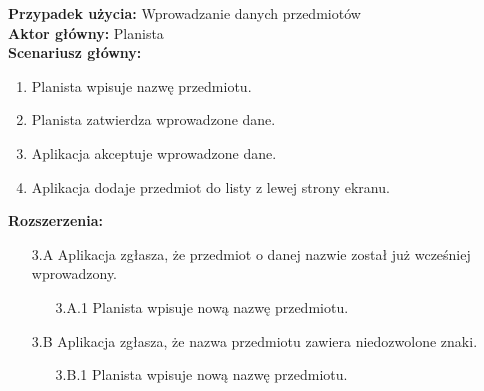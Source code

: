 \noindent
\textbf{Przypadek użycia:} Wprowadzanie danych przedmiotów\\
\textbf{Aktor główny:} Planista\\
\textbf{Scenariusz główny:}
\begin{enumerate}
	\item Planista wpisuje nazwę przedmiotu.
	\item Planista zatwierdza wprowadzone dane.
	\item Aplikacja akceptuje wprowadzone dane.
	\item Aplikacja dodaje przedmiot do listy z lewej strony ekranu.
\end{enumerate}
\textbf{Rozszerzenia:}
	\begin{enumerate}
         \item[3.A] Aplikacja zgłasza, że przedmiot o danej nazwie został już wcześniej wprowadzony.
         \begin{enumerate}
         	\item[3.A.1] Planista wpisuje nową nazwę przedmiotu.
         \end{enumerate}
         \item[3.B] Aplikacja zgłasza, że nazwa przedmiotu zawiera niedozwolone znaki.
         \begin{enumerate}
         	\item[3.B.1] Planista wpisuje nową nazwę przedmiotu.
         \end{enumerate}
	\end{enumerate}
	
